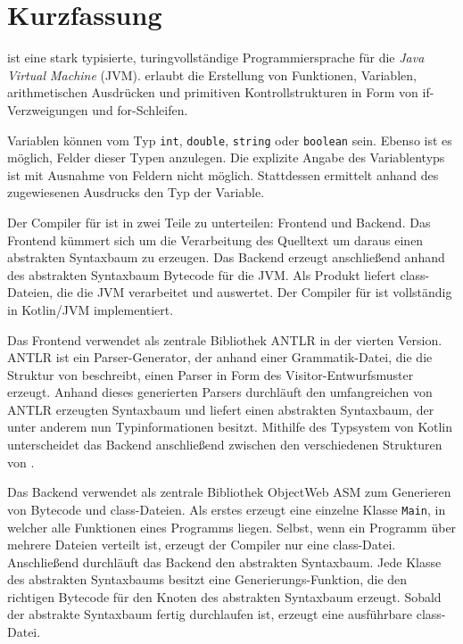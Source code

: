 \chapter{Kurzfassung}

\Toya ist eine stark typisierte, turing\-vollständige Programmiersprache für die \textit{Java Virtual Machine} (JVM). \Toya erlaubt die Erstellung von Funktionen, Variablen, arithmetischen Ausdrücken und primitiven Kontrollstrukturen in Form von if-Verzweigungen und for-Schleifen.

Variablen können vom Typ \texttt{int}, \texttt{double}, \texttt{string} oder \texttt{boolean} sein. Ebenso ist es möglich, Felder dieser Typen anzulegen. Die explizite Angabe des Variablentyps ist mit Ausnahme von Feldern nicht möglich. Stattdessen ermittelt \toya anhand des zugewiesenen Ausdrucks den Typ der Variable.

Der Compiler für \toya ist in zwei Teile zu unterteilen: Frontend und Backend. Das Frontend kümmert sich um die Verarbeitung des Quelltext um daraus einen abstrakten Syntaxbaum zu erzeugen. Das Backend erzeugt anschließend anhand des abstrakten Syntaxbaum Bytecode für die JVM. Als Produkt liefert \toya class-Dateien, die die JVM verarbeitet und auswertet. Der Compiler für \toya ist vollständig in Kotlin/JVM implementiert.

Das Frontend verwendet als zentrale Bibliothek ANTLR in der vierten Version. ANTLR ist ein Parser-Generator, der anhand einer Grammatik-Datei, die die Struktur von \toya beschreibt, einen Parser in Form des Visitor-Entwurfsmuster erzeugt. Anhand dieses generierten Parsers durchläuft \toya den umfangreichen von ANTLR erzeugten Syntaxbaum und liefert einen abstrakten Syntaxbaum, der unter anderem nun Typinformationen besitzt. Mithilfe des Typsystem von Kotlin unterscheidet das Backend anschließend zwischen den verschiedenen Strukturen von \toya.

Das Backend verwendet als zentrale Bibliothek ObjectWeb ASM zum Generieren von Bytecode und class-Dateien. Als erstes erzeugt \toya eine einzelne Klasse \texttt{Main}, in welcher alle Funktionen eines \toya Programms liegen. Selbst, wenn ein \toya Programm über mehrere Dateien verteilt ist, erzeugt der Compiler nur eine class-Datei. Anschließend durchläuft das Backend den abstrakten Syntaxbaum. Jede Klasse des abstrakten Syntaxbaums besitzt eine Generierungs-Funktion, die den richtigen Bytecode für den Knoten des abstrakten Syntaxbaum erzeugt. Sobald der abstrakte Syntaxbaum fertig durchlaufen ist, erzeugt \toya eine ausführbare class-Datei.